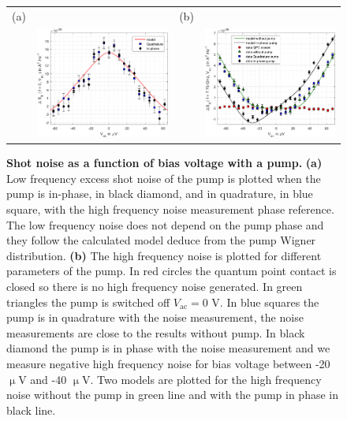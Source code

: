 \begin{figure}[hptb]
	\begin{center}
		\begin{tabular}{c c c c}
			(a) & & (b) & \\
			& \includegraphics[width = 6.5 cm]{./chap3/LF_noise_squeezed_181206} &
			& \includegraphics[width = 6.5 cm]{./chap3/RF_noise_squeezed_181206}
		\end{tabular}
	\end{center}
	
	\caption{\textbf{Shot noise as a function of bias voltage with a pump.} \textbf{(a)} Low frequency excess shot noise of the pump is plotted when the pump is in-phase, in black diamond, and in quadrature, in blue square, with the high frequency noise measurement phase reference. The low frequency noise does not depend on the pump phase and they follow the calculated model deduce from the pump Wigner distribution. \textbf{(b)} The high frequency noise is plotted for different parameters of the pump. In red circles the quantum point contact is closed so there is no high frequency noise generated. In green triangles the pump is switched off $V_{\mathrm{ac}} = 0$ V. In blue squares the pump is in quadrature with the noise measurement, the noise measurements are close to the results without pump. In black diamond the pump is in phase with the noise measurement and we measure negative high frequency noise for bias voltage between -20 $\upmu$V and -40 $\upmu$V. Two models are plotted for the high frequency noise without the pump in green line and with the pump in phase in black line.}
	\label{fig: squeezing 181206}
\end{figure}

